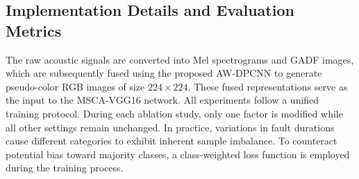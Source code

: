 \documentclass[anonymous]{iopjournal}
\begin{document}
\subsection{Implementation Details and Evaluation Metrics}
The raw acoustic signals are converted into Mel spectrograms and GADF images, which are subsequently fused using the proposed AW-DPCNN to generate pseudo-color RGB images of size $224 \times 224$. These fused representations serve as the input to the MSCA-VGG16 network. All experiments follow a unified training protocol. During each ablation study, only one factor is modified while all other settings remain unchanged. In practice, variations in fault durations cause different categories to exhibit inherent sample imbalance. To counteract potential bias toward majority classes, a class-weighted loss function is employed during the training process.
\end{document}
